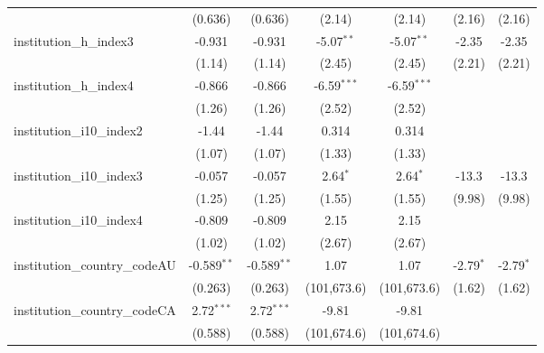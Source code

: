 \begin{tabular}{lcccccc}
                                         & (0.636)        & (0.636)        & (2.14)        & (2.14)        & (2.16)        & (2.16)\\   
   institution\_h\_index3                & -0.931         & -0.931         & -5.07$^{**}$  & -5.07$^{**}$  & -2.35         & -2.35\\   
                                         & (1.14)         & (1.14)         & (2.45)        & (2.45)        & (2.21)        & (2.21)\\   
   institution\_h\_index4                & -0.866         & -0.866         & -6.59$^{***}$ & -6.59$^{***}$ &               &   \\   
                                         & (1.26)         & (1.26)         & (2.52)        & (2.52)        &               &   \\   
   institution\_i10\_index2              & -1.44          & -1.44          & 0.314         & 0.314         &               &   \\   
                                         & (1.07)         & (1.07)         & (1.33)        & (1.33)        &               &   \\   
   institution\_i10\_index3              & -0.057         & -0.057         & 2.64$^{*}$    & 2.64$^{*}$    & -13.3         & -13.3\\   
                                         & (1.25)         & (1.25)         & (1.55)        & (1.55)        & (9.98)        & (9.98)\\   
   institution\_i10\_index4              & -0.809         & -0.809         & 2.15          & 2.15          &               &   \\   
                                         & (1.02)         & (1.02)         & (2.67)        & (2.67)        &               &   \\   
   institution\_country\_codeAU          & -0.589$^{**}$  & -0.589$^{**}$  & 1.07          & 1.07          & -2.79$^{*}$   & -2.79$^{*}$\\   
                                         & (0.263)        & (0.263)        & (101,673.6)   & (101,673.6)   & (1.62)        & (1.62)\\   
   institution\_country\_codeCA          & 2.72$^{***}$   & 2.72$^{***}$   & -9.81         & -9.81         &               &   \\   
                                         & (0.588)        & (0.588)        & (101,674.6)   & (101,674.6)   &               &   \\   

\end{tabular}
